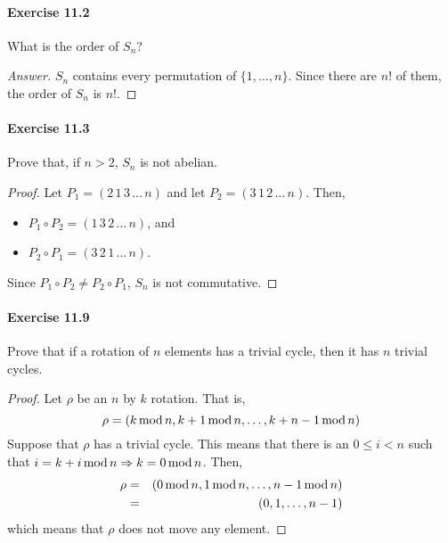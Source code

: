 \paragraph{Exercise 11.2}
What is the order of $S_n$?

\begin{proof}[Answer]
$S_n$ contains every permutation of $\{1,\dots,n\}$. Since there are $n!$ of
them, the order of $S_n$ is $n!$.
\end{proof}

\paragraph{Exercise 11.3}
Prove that, if $n > 2$, $S_n$ is not abelian.

\begin{proof}
Let $P_1 = (2 \, 1 \, 3 \, \dots \, n)$ and let
$P_2 = (3 \, 1 \, 2 \, \dots \, n)$. Then,
\begin{itemize}
    \item $P_1 \circ P_2 = (1 \, 3 \, 2 \, \dots \, n)$, and
    \item $P_2 \circ P_1 = (3 \, 2 \, 1 \, \dots \, n)$.
\end{itemize}
Since $P_1 \circ P_2 \neq P_2 \circ P_1$, $S_n$ is not commutative.
\end{proof}


\paragraph{Exercise 11.9}
Prove that if a rotation of $n$ elements has a trivial cycle, then it has $n$
trivial cycles.

\begin{proof}
Let $\rho$ be an $n$ by $k$ rotation. That is,
$$\rho = (k \, \mathrm{mod} \, n, k+1 \, \mathrm{mod} \, n, \dots, k+n-1 \, \mathrm{mod} \, n)$$
Suppose that $\rho$ has a trivial cycle. This means that there is an
$0 \leq i < n$ such that $i = k + i \, \mathrm{mod} \, n \Rightarrow 
k = 0 \, \mathrm{mod} \, n$. Then, 
\begin{eqnarray*}
    \rho &=& (0 \, \mathrm{mod} \, n, 1 \, \mathrm{mod} \, n, \dots, n-1 \, \mathrm{mod} \, n) \\
         &=& (0, 1, \dots, n-1)
\end{eqnarray*}
which means that $\rho$ does not move any element.
\end{proof}
